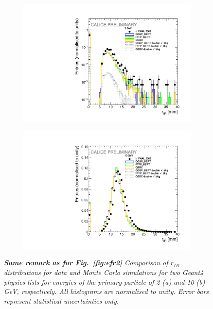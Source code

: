 \begin{figure}
	\centering
	\begin{subfigure}{0.5\textwidth}
		\centering
		\includegraphics[width=.90\linewidth]{ECAL/plots/r-ir-2.pdf}
		\caption{\label{fig:rir2} }
	\end{subfigure}%
	\begin{subfigure}{0.5\textwidth}
		\centering
		\includegraphics[width=.90\linewidth]{ECAL/plots/r-ir-10.pdf}
		\caption{\label{fig:rir10} }
	\end{subfigure}
	\caption{\label{fig:rirexample} \sl {\bf Same remark as for Fig.~\ref{fig:efr2} } Comparison of $r_{IR}$ distributions for data and Monte Carlo simulations for two {\sc Geant}4 physics lists for energies of the primary particle of 2 (a) and 10 (b) GeV, respectively. All histograms are normalised to unity. Error bars represent statistical uncertainties only.}
\end{figure}

